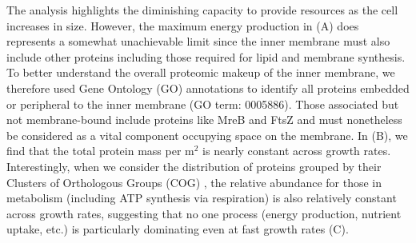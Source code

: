The analysis highlights the diminishing capacity to provide resources as the
cell increases in size. However, the maximum energy production in
(A) does represents a somewhat unachievable limit since
the inner membrane must also include other proteins including those required
for lipid and membrane synthesis. To better
understand the overall proteomic makeup of the inner membrane, we therefore
used Gene Ontology (GO) annotations \citep{ashburner2000,
thegeneOntologyconsortium2018} to identify all proteins embedded or
peripheral to the inner membrane (GO term: 0005886). Those associated but not
membrane-bound include proteins like MreB and FtsZ%
and must nonetheless be considered as a vital
component occupying space on the membrane. In (B), we
find that the total protein mass per \textmu m$^2$ is nearly constant across
growth rates. Interestingly, when we consider the distribution of proteins
grouped by their Clusters of Orthologous Groups (COG) \citep{tatusov2000},
the relative abundance for those in metabolism (including ATP synthesis via
respiration) is also relatively constant across growth rates, suggesting that
no one process (energy production, nutrient uptake, etc.) is particularly
dominating even at fast growth rates (C).

